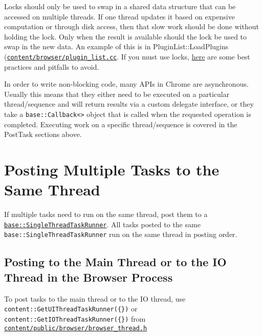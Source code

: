 \documentclass[a4paper,12pt,notitlepage,twoside,openright]{article}
\begin{document}
Locks should only be used to swap in a shared data structure that can be
accessed on multiple threads. If one thread updates it based on
expensive computation or through disk access, then that slow work should
be done without holding the lock. Only when the result is available
should the lock be used to swap in the new data. An example of this is
in PluginList::LoadPlugins
(\href{https://cs.chromium.org/chromium/src/content/browser/plugin_list.cc}{\texttt{content/browser/plugin\_list.cc}}.
If you must use locks,
\href{https://www.chromium.org/developers/lock-and-condition-variable}{here}
are some best practices and pitfalls to avoid.

In order to write non-blocking code, many APIs in Chrome are
asynchronous. Usually this means that they either need to be executed on
a particular thread/sequence and will return results via a custom
delegate interface, or they take a
\texttt{base::Callback\textless{}\textgreater{}} object that is called
when the requested operation is completed. Executing work on a specific
thread/sequence is covered in the PostTask sections above.

\hypertarget{posting-multiple-tasks-to-the-same-thread}{%
\section{Posting Multiple Tasks to the Same
Thread}\label{posting-multiple-tasks-to-the-same-thread}}

If multiple tasks need to run on the same thread, post them to a
\href{https://cs.chromium.org/chromium/src/base/single_thread_task_runner.h}{\texttt{base::SingleThreadTaskRunner}}.
All tasks posted to the same \texttt{base::SingleThreadTaskRunner} run
on the same thread in posting order.

\hypertarget{posting-to-the-main-thread-or-to-the-io-thread-in-the-browser-process}{%
\subsection{Posting to the Main Thread or to the IO Thread in the
Browser
Process}\label{posting-to-the-main-thread-or-to-the-io-thread-in-the-browser-process}}

To post tasks to the main thread or to the IO thread, use
\texttt{content::GetUIThreadTaskRunner(\{\})} or
\texttt{content::GetIOThreadTaskRunner(\{\})} from
\href{https://cs.chromium.org/chromium/src/content/public/browser/browser_thread.h}{\texttt{content/public/browser/browser\_thread.h}}
\end{document}
